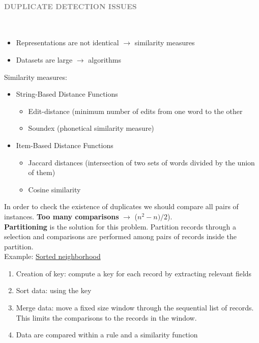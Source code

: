 \documentclass[10pt,a4paper]{article}
\newcommand{\myparagraph}[1]{\paragraph{\normalsize{\textcolor{gray}{\uppercase{\textbf{#1}}}} }\mbox{} \vspace{0.5em}\\}
\begin{document}
\pagebreak
\myparagraph{Duplicate Detection Issues}
\begin{itemize}
	\item Representations are not identical $\rightarrow$ similarity measures
	\item Datasets are large $\rightarrow$ algorithms
\end{itemize}
Similarity measures:
\begin{itemize}
	\item String-Based Distance Functions
	\begin{itemize}
		\item Edit-distance (minimum number of edits from one word to the other
		\item Soundex (phonetical similarity measure)
	\end{itemize}
	\item Item-Based Distance Functions
	\begin{itemize}
		\item Jaccard distances (intersection of two sets of words divided by the union of them)
		\item Cosine similarity
	\end{itemize}
\end{itemize}
In order to check the existence of duplicates we should compare all pairs of instances. \textbf{Too many comparisons} $\rightarrow$ ($n^2-n)/2$). \\
\textbf{Partitioning} is the solution for this problem. Partition records through a selection and comparisons are performed among pairs of records inside the partition. \\ 
Example: \uline{Sorted neighborhood}
\begin{enumerate}
	\item Creation of key: compute a key for each record by extracting relevant fields
	\item Sort data: using the key 
	\item Merge data: move a fixed size window through the sequential list of records. This limits the comparisons to the records in the window. 
	\item Data are compared within a rule and a similarity function
\end{enumerate}
\end{document}
